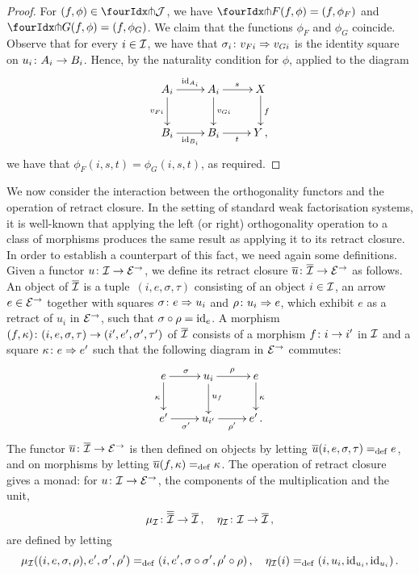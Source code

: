 \documentclass[reqno,10pt,a4paper,oneside]{amsart}
\begin{document}
\begin{proof} For $(f, \phi) \in \liftr{\cal{J}}$, we have $\liftr{F}(f, \phi) = (f, \phi_F)$ and $\liftr{G}(f, \phi) = (f, \phi_G)$.
We claim that the functions $\phi_F$ and $\phi_G$ coincide. Observe that 
for every $i \in \cal{I}$, we have that $\sigma_i \co v_{Fi}  \Rightarrow v_{Gi}$ is the identity square on $u_i
\co A_i \to B_i$. Hence, by the naturality condition for $\phi$, applied to the diagram 
\[
\xymatrix{
A_i \ar[r]^{\id_{A_i}} \ar[d]_{v_{Fi}}  & A_i \ar[d]^{v_{Gi}} \ar[r]^{s}  & X \ar[d]^{f} \\
B_i \ar[r]_{\id_{B_i}} & B_i \ar[r]_{t} & Y \, ,}
\]
we have  that $\phi_F(i, s, t) = \phi_G(i, s, t)$, as required.
\end{proof} 


We now consider the interaction between the orthogonality functors and the operation of retract closure. 
In the setting of standard weak factorisation systems, it is well-known that
applying the left (or right) orthogonality operation to a class of morphisms produces the same result as applying it to its retract closure. 
In order to establish a counterpart of this fact, we need again some definitions. 
Given a  functor $u \co \cal{I} \to \catE^{\to}$, we define its retract closure $\overline{u} \co \overline{\cal{I}} \to \catE^{\to}$ as follows. 
An object of $\overline{\cal{I}}$ is a tuple~$(i, e, \sigma, \tau)$ consisting of an object $i \in \cal{I}$, an arrow $e \in \cal{E}^\to$ together with squares $\sigma \co e \Rightarrow u_i$ and $\rho \co u_i \Rightarrow e$,
which exhibit $e$ as a retract of $u_i$ in  $\catE^{\to}$,  \ie such that $\sigma \cc \rho = \id_e$. 
A morphism $(f, \kappa) \co (i, e, \sigma, \tau) \to (i', e', \sigma', \tau')$ of $\overline{\cal{I}}$  consists of a morphism $f \co i \to i'$ in $\cal{I}$ and a square $\kappa \co e \Rightarrow e'$  such that the following diagram in $\cal{E}^\to$ commutes:
\[
\xymatrix{
  e
  \ar[r]^{\sigma}
    \ar[d]_{\kappa}
&
  u_i
  \ar[r]^{\rho}
  \ar[d]^{u_f}
&
  e
  \ar[d]^{\kappa}
\\
  e'
  \ar[r]_{\sigma'}
&
  u_{i'}
  \ar[r]_{\rho'}
&
  e' \, .
}
\]
The functor $\overline{u} \co \overline{\cal{I}} \to \catE^\to$ is then defined  on objects  by letting 
$\overline{u}(i, e, \sigma, \tau) \defeq e$,
and on morphisms by letting $\overline{u}(f, \kappa) \defeq \kappa$. The operation of retract closure gives a monad: for $u \co \cal{I} \to \catE^{\to}$,
the components of the multiplication and the unit, 
\[
\mu_\cal{I} \co \overline{\overline{\cal{I}}} \to \overline{\cal{I}} \, , \quad
\eta_\cal{I} \co \cal{I} \to \overline{\cal{I}} \, ,
\]
are defined by letting
\[
\mu_\cal{I}((i, e, \sigma,  \rho), e', \sigma', \rho') \defeq (i, e', \sigma \cc \sigma', \rho' \cc \rho) \, , \quad
\eta_\cal{I}(i) \defeq (i, u_i, \id_{u_i}, \id_{u_i}) \, .
\]
\end{document}
